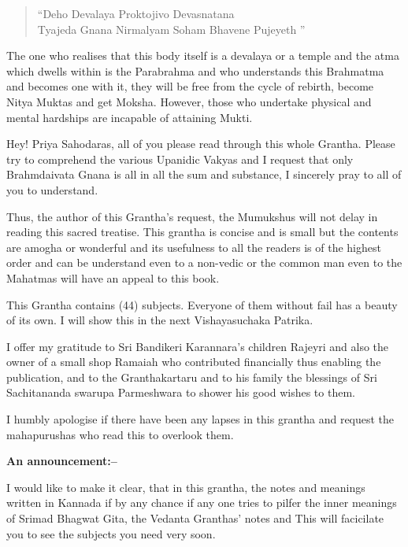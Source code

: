 \begin{verse}
 “Deho Devalaya Proktojivo Devasnatana \\
 Tyajeda Gnana Nirmalyam Soham Bhavene Pujeyeth ”
\end{verse}

The one who realises that this body itself is a devalaya or a temple and the atma which dwells within is the Parabrahma and who understands this Brahmatma and becomes one with it, they will be free from the cycle of rebirth, become Nitya Muktas and get Moksha. However, those who undertake physical and mental hardships are incapable of attaining Mukti.

\newpage

Hey! Priya Sahodaras, all of you please read through this whole Grantha. Please try to comprehend the various Upanidic Vakyas and I request that only Brahmdaivata Gnana is all in all the sum and substance, I sincerely pray to all of you to understand.

\vskip 2pt

Thus, the author of this Grantha's request, the Mumukshus will not delay in reading this sacred treatise. This grantha is concise and is small but the contents are amogha or wonderful and its usefulness to all the readers is of the highest order and can be understand even to a non-vedic or the common man even to the Mahatmas will have an appeal to this book.

\vskip 2pt

This Grantha contains (44) subjects. Everyone of them without fail has a beauty of its own. I will show this in the next Vishayasuchaka Patrika.

\vskip 2pt

I offer my gratitude to Sri Bandikeri Karannara's children Rajeyri and also the owner of a small shop Ramaiah who contributed financially thus enabling the publication, and to the Granthakartaru and to his family the blessings of Sri Sachitananda swarupa Parmeshwara to shower his good wishes to them.

\vskip 2pt

I humbly apologise if there have been any lapses in this grantha and request the mahapurushas who read this to overlook them.

\vskip 5pt

\textbf{An announcement:–}

\vskip 2pt

I would like to make it clear, that in this grantha, the notes and meanings written in Kannada if by any chance if any one tries to pilfer the inner meanings of Srimad Bhagwat Gita, the Vedanta Granthas' notes and This will facicilate you to see the subjects you need very soon.


